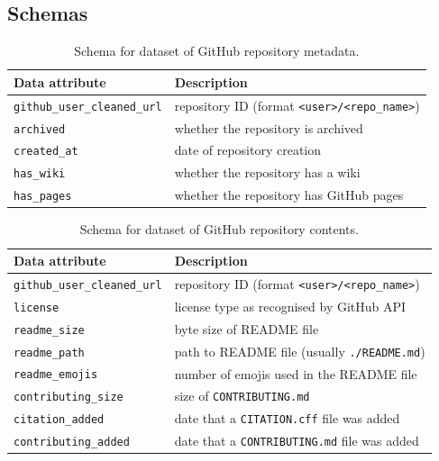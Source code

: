 \documentclass[10pt,a4paper]{scrartcl}
\begin{document}
\subsection*{Schemas}
\label{section:app_schemas_collection}


\begin{table}
    \centering
    \begin{tabular}{l|l}
        \hline
        Data attribute & Description \\
        \hline
        \verb|github_user_cleaned_url| & repository ID (format \verb|<user>/<repo_name>|) \\
        \verb|archived| & whether the repository is archived \\
        \verb|created_at| & date of repository creation \\
        \verb|has_wiki| & whether the repository has a wiki \\
        \verb|has_pages| & whether the repository has GitHub pages \\
        \hline
    \end{tabular}
    \caption{Schema for dataset of GitHub repository metadata.}
    \label{table:metadata}
\end{table}

\begin{table}
    \centering
    \begin{tabular}{l|l}
        \hline
        Data attribute & Description \\
        \hline
        \verb|github_user_cleaned_url| & repository ID (format \verb|<user>/<repo_name>|) \\
        \verb|license| & license type as recognised by GitHub API \\
        \verb|readme_size| & byte size of README file \\
        \verb|readme_path| & path to README file (usually \verb|./README.md|) \\
        \verb|readme_emojis| & number of emojis used in the README file \\
        \verb|contributing_size| & size of \verb|CONTRIBUTING.md| \\
        \verb|citation_added| & date that a \verb|CITATION.cff| file was added \\
        \verb|contributing_added| & date that a \verb|CONTRIBUTING.md| file was added \\
        \hline
    \end{tabular}
    \caption{Schema for dataset of GitHub repository contents.}
    \label{table:contents}
\end{table}
\end{document}

